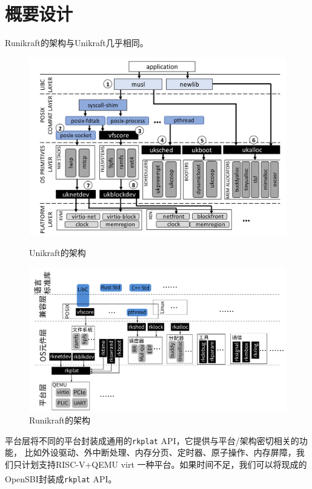 \documentclass[UTF8,fontset=none,linespread=1.15]{ctexart}
\let\nosupcite\cite
\renewcommand*{\cite}[1]{\textsuperscript{\nosupcite{#1}}}
\begin{document}
\section{概要设计}
Runikraft的架构与Unikraft几乎相同。
\begin{figure}[!hbt]
\centering
\begin{minipage}{0.49\linewidth}
\centering
\includegraphics[width=\linewidth]{assets/Unikraft-architecture.png}
\caption{Unikraft的架构}\label{fig:unikraft-arch}
\end{minipage}
\begin{minipage}{0.49\linewidth}
\centering
\includegraphics[width=\linewidth]{assets/Runikraft-architecture.pdf}
\caption{Runikraft的架构}\label{fig:runikraft-arch}
\end{minipage}
\end{figure}
平台层将不同的平台封装成通用的\texttt{rkplat} API，它提供与平台/架构密切相关的功能，
比如外设驱动、外中断处理、内存分页、定时器、原子操作、内存屏障，我们只计划支持RISC-V+QEMU virt
一种平台。如果时间不足，我们可以将现成的OpenSBI\cite{5}\cite{6}封装成\texttt{rkplat} API。
\end{document}
